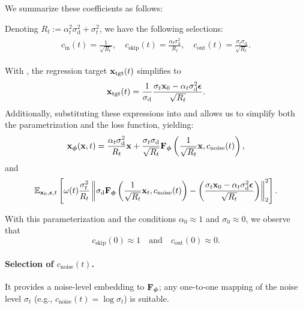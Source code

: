 We summarize these coefficients as follows:
\begin{mdframed}
Denoting $R_t := \alpha_t^2 \sigma_{\mathrm{d}}^2+ \sigma_t^2$, we have the following selections:
    \begin{align}\label{eq:edm-coeff}
        \begin{aligned}
            c_{\mathrm{in}}(t)  = \frac{1}{\sqrt{R_t}}, \quad
            c_{\mathrm{skip}}(t) = \frac{\alpha_t \sigma_{\mathrm{d}}^2 }{R_t}, \quad
            c_{\mathrm{out}}(t) =  \frac{\sigma_t \sigma_{\mathrm{d}} }{\sqrt{R_t}}.
        \end{aligned}
    \end{align}
\end{mdframed}

With , the regression target ${\mathbf{x}}_{\mathrm{tgt}}(t)$ simplifies to
\[
{\mathbf{x}}_{\mathrm{tgt}}(t) = \frac{1}{\sigma_{\mathrm{d}}}\frac{\sigma_t {\mathbf{x}}_0 - \alpha_t \sigma_{\mathrm{d}}^2\bm{\epsilon} }{\sqrt{R_t}}.
\] 
Additionally, substituting these expressions into  and  allows us to simplify both the parametrization and the loss function, yielding:
\begin{align*}
    {\mathbf{x}}_{\bm{\phi}}({\mathbf{x}}, t)=\frac{\alpha_t \sigma_{\mathrm{d}}^2 }{R_t} {\mathbf{x}} + \frac{\sigma_t \sigma_{\mathrm{d}} }{\sqrt{R_t}}{\mathbf{F}}_{\bm{\phi}}\left(\frac{1}{\sqrt{R_t}}{\mathbf{x}}, c_{\mathrm{noise}}(t)\right),
\end{align*}
and
\begin{align*}
   \mathbb{E}_{{\mathbf{x}}_0, \bm{\epsilon}, t} \left[\omega(t)\frac{\sigma_t^2  }{R_t}\left\lVert \sigma_{\mathrm{d}} {\mathbf{F}}_{\bm{\phi}}\left(\frac{1}{\sqrt{R_t}}{\mathbf{x}}_t, c_{\mathrm{noise}}(t)\right) - \left(\frac{\sigma_t {\mathbf{x}}_0 - \alpha_t \sigma_{\mathrm{d}}^2\bm{\epsilon} }{\sqrt{R_t}}\right)\right\rVert_2^2\right].
\end{align*}

With this parameterization and the conditions $\alpha_0 \approx 1$ and $\sigma_0 \approx 0$, we observe that  
\[
c_{\mathrm{skip}}(0) \approx 1 \quad \text{and} \quad c_{\mathrm{out}}(0) \approx 0.
\]  


\paragraph{Selection of $c_{\mathrm{noise}}(t)$.}
It provides a noise-level embedding to ${\mathbf{F}}_{\bm{\phi}}$; any
one-to-one mapping of the noise level $\sigma_t$ (e.g., $c_{\mathrm{noise}}(t)=\log \sigma_t$) is suitable.

